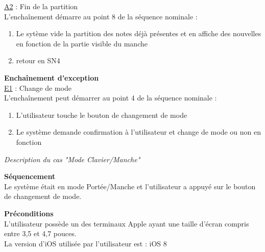 \documentclass{scrreprt}
\begin{document}
\noindent \underline{A2} : Fin de la partition\\
L'enchaînement démarre au point 8 de la séquence nominale :\\
\begin{enumerate}
\item Le sytème vide la partition des notes déjà présentes et en affiche des nouvelles en fonction de la partie visible du manche
\item retour en SN4
\end{enumerate}

\textbf{Enchaînement d'exception}\\
\underline{E1} : Change de mode\\
L'enchaînement peut démarrer au point 4 de la séquence nominale :\\
\begin{enumerate}
\item L'utilisateur touche le bouton de changement de mode
\item Le système demande confirmation à l'utilisateur et change de mode ou non en fonction
\end{enumerate}

\bigbreak
\noindent \emph{Description du cas "Mode Clavier/Manche"}\newline
\medbreak

\textbf{Séquencement}\\
Le système était en mode Portée/Manche et l'utilisateur a appuyé sur le bouton de changement de mode.

\bigbreak
\textbf{Préconditions}\\
L'utilisateur possède un des terminaux Apple ayant une taille d'écran compris entre 3,5 et 4,7 pouces.\\
La version d'iOS utilisée par l'utilisateur est : iOS 8
\bigbreak
\end{document}
